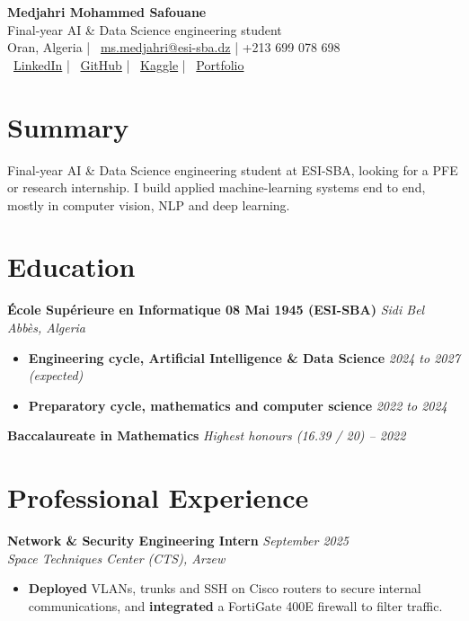 \documentclass[10pt,a4paper]{article}
\begin{document}
\begin{center}
    {\Large \textbf{\color{accent} Medjahri Mohammed Safouane}} \\ [0.25em]
    {\large Final-year AI \& Data Science engineering student} \\ [0.35em]
    \faMapMarker* Oran, Algeria \quad | \quad
    \faEnvelope \ \href{mailto:ms.medjahri@esi-sba.dz}{ms.medjahri@esi-sba.dz} \quad | \quad
    \faPhone* +213 699 078 698 \\ [0.15em]
    \faLinkedin \ \href{https://www.linkedin.com/in/mohammed-safouane-medjahri-0bb181296/}{LinkedIn} \quad | \quad
    \faGithub \ \href{https://github.com/S4afou}{GitHub} \quad | \quad
    \faKaggle \ \href{https://www.kaggle.com/s4afou}{Kaggle} \quad | \quad
    \faGlobe \ \href{https://safouane-medjahri.vercel.app}{Portfolio}
\end{center}

\section{Summary}
Final-year AI \& Data Science engineering student at ESI-SBA, looking for a PFE or research internship. I build applied machine-learning systems end to end, mostly in computer vision, NLP and deep learning.

\section{Education}

\textbf{École Supérieure en Informatique 08 Mai 1945 (ESI-SBA)} \hfill \textit{Sidi Bel Abbès, Algeria}
\begin{itemize}
    \item \textbf{Engineering cycle, Artificial Intelligence \& Data Science} \hfill \textit{2024 to 2027 (expected)}
    \item \textbf{Preparatory cycle, mathematics and computer science} \hfill \textit{2022 to 2024}
\end{itemize}
\textbf{Baccalaureate in Mathematics} \hfill \textit{Highest honours (16.39 / 20) -- 2022}
\section{Professional Experience}

\textbf{Network \& Security Engineering Intern} \hfill \textit{September 2025} \\
\textit{Space Techniques Center (CTS), Arzew}
\begin{itemize}
    \item \textbf{Deployed} VLANs, trunks and SSH on Cisco routers to secure internal communications, and \textbf{integrated} a FortiGate 400E firewall to filter traffic.
\end{itemize}
\end{document}
